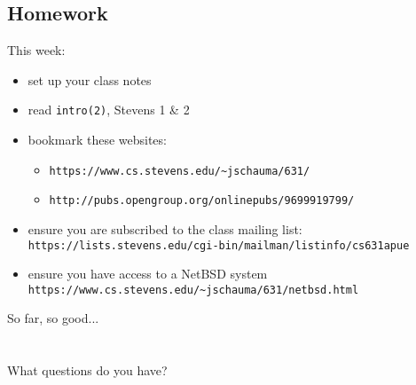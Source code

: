 \documentclass[sxga]{xdvislides}
\begin{document}
\subsection{Homework}
This week:
\begin{itemize}
	\item set up your class notes
	\item read {\tt intro(2)}, Stevens 1 \& 2
	\item bookmark these websites:
		\begin{itemize}
			\item {\tt https://www.cs.stevens.edu/\~{}jschauma/631/}
			\item {\tt http://pubs.opengroup.org/onlinepubs/9699919799/}
		\end{itemize}
	\item ensure you are subscribed to the class mailing list: \\
		{\tt https://lists.stevens.edu/cgi-bin/mailman/listinfo/cs631apue}
	\item ensure you have access to a NetBSD system
		{\tt https://www.cs.stevens.edu/\~{}jschauma/631/netbsd.html}
	\vspace{.5in}
\end{itemize}

\newpage
\vspace*{\fill}
\begin{center}
    \Hugesize
        So far, so good...\\ [1em]
    \hspace*{5mm}
    \blueline\\
    \hspace*{5mm}\\
	What questions do you have?
\end{center}
\vspace*{\fill}
\end{document}
